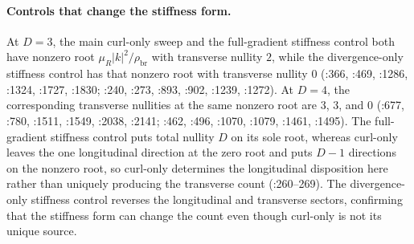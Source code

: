 \paragraph{Controls that change the stiffness form.}
At \(D=3\), the main curl-only sweep and the full-gradient stiffness control
both have nonzero root \(\mu_R|k|^2/\rho_{\mathrm{br}}\) with transverse
nullity \(2\), while the divergence-only stiffness control has that nonzero
root with transverse nullity \(0\)
(:366,
:469, :1286, :1324, :1727, :1830;
:240,
:273, :893, :902, :1239, :1272).
At \(D=4\), the corresponding transverse nullities at the same nonzero root
are \(3\), \(3\), and \(0\)
(:677,
:780, :1511, :1549, :2038, :2141;
:462,
:496, :1070, :1079, :1461, :1495).
The full-gradient stiffness control puts total nullity \(D\) on its sole root,
whereas curl-only leaves the one longitudinal direction at the zero root and
puts \(D-1\) directions on the nonzero root, so curl-only determines the
longitudinal disposition here rather than uniquely producing the transverse
count
(:260--269).
The divergence-only stiffness control reverses the longitudinal and transverse
sectors, confirming that the stiffness form can change the count even though
curl-only is not its unique source.

